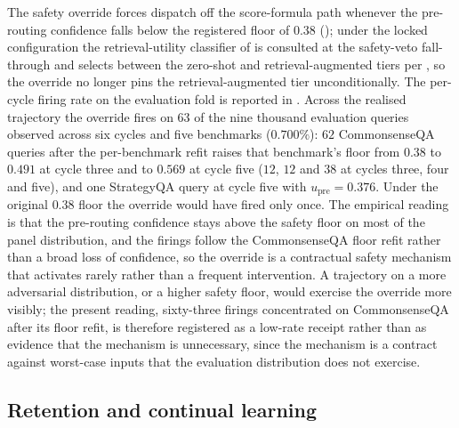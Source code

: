 The safety override forces dispatch off the score-formula path whenever the pre-routing confidence falls below the registered floor of $0.38$ (); under the locked configuration the retrieval-utility classifier of  is consulted at the safety-veto fall-through and selects between the zero-shot and retrieval-augmented tiers per , so the override no longer pins the retrieval-augmented tier unconditionally. The per-cycle firing rate on the evaluation fold is reported in . Across the realised trajectory the override fires on $63$ of the nine thousand evaluation queries observed across six cycles and five benchmarks ($0.700\%$): $62$ CommonsenseQA queries after the per-benchmark refit raises that benchmark's floor from $0.38$ to $0.491$ at cycle three and to $0.569$ at cycle five ($12$, $12$ and $38$ at cycles three, four and five), and one StrategyQA query at cycle five with $u_{\text{pre}} = 0.376$. Under the original $0.38$ floor the override would have fired only once. The empirical reading is that the pre-routing confidence stays above the safety floor on most of the panel distribution, and the firings follow the CommonsenseQA floor refit rather than a broad loss of confidence, so the override is a contractual safety mechanism that activates rarely rather than a frequent intervention. A trajectory on a more adversarial distribution, or a higher safety floor, would exercise the override more visibly; the present reading, sixty-three firings concentrated on CommonsenseQA after its floor refit, is therefore registered as a low-rate receipt rather than as evidence that the mechanism is unnecessary, since the mechanism is a contract against worst-case inputs that the evaluation distribution does not exercise.



\FloatBarrier

\subsection{Retention and continual learning}
\label{sec:retention}

